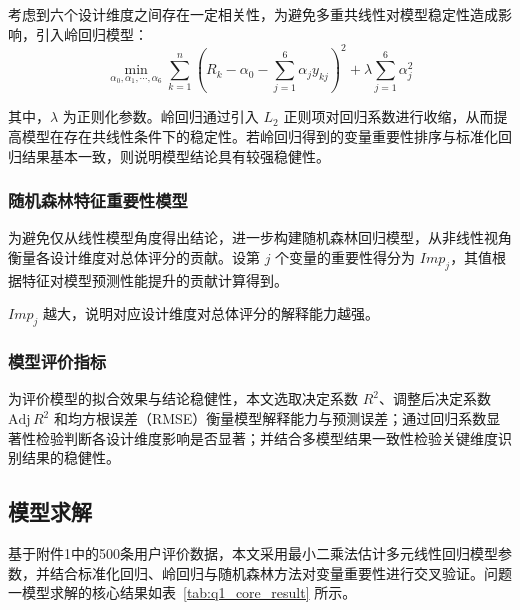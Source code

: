 \documentclass[withoutpreface,bwprint]{cumcmthesis} %
\begin{document}
考虑到六个设计维度之间存在一定相关性，为避免多重共线性对模型稳定性造成影响，引入岭回归模型\cite{hoerl1970,lihang2019}：
\begin{equation}
\min_{\alpha_0,\alpha_1,\cdots,\alpha_6} 
\sum_{k=1}^{n} \left( R_k - \alpha_0 - \sum_{j=1}^{6} \alpha_j y_{kj} \right)^2 
+ \lambda \sum_{j=1}^{6} \alpha_j^2
\end{equation}

其中，$\lambda$ 为正则化参数。岭回归通过引入 $L_2$ 正则项对回归系数进行收缩，从而提高模型在存在共线性条件下的稳定性。若岭回归得到的变量重要性排序与标准化回归结果基本一致，则说明模型结论具有较强稳健性。

\subsubsection{随机森林特征重要性模型}

为避免仅从线性模型角度得出结论，进一步构建随机森林回归模型，从非线性视角衡量各设计维度对总体评分的贡献\cite{breiman2001}。设第 $j$ 个变量的重要性得分为 $Imp_j$，其值根据特征对模型预测性能提升的贡献计算得到。

$Imp_j$ 越大，说明对应设计维度对总体评分的解释能力越强。

\subsubsection{模型评价指标}

为评价模型的拟合效果与结论稳健性，本文选取决定系数 $R^2$、调整后决定系数 $\mathrm{Adj}\,R^2$ 和均方根误差（RMSE）衡量模型解释能力与预测误差；通过回归系数显著性检验判断各设计维度影响是否显著；并结合多模型结果一致性检验关键维度识别结果的稳健性。

\subsection{模型求解}

基于附件1中的500条用户评价数据，本文采用最小二乘法估计多元线性回归模型参数，并结合标准化回归、岭回归与随机森林方法对变量重要性进行交叉验证。问题一模型求解的核心结果如表~\ref{tab:q1_core_result} 所示。
\end{document}
